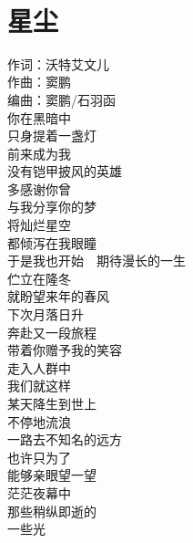 \documentclass[twocolumn]{article}
\begin{document}
\newpage
~
\newpage
\section{星尘}
\noindent
{\kaishu
	作词：沃特艾文儿\\
	作曲：窦鹏\\
	编曲：窦鹏/石羽函\\
}
你在黑暗中\\
只身提着一盏灯\\
前来成为我\\
没有铠甲披风的英雄\\
多感谢你曾\\
与我分享你的梦\\
将灿烂星空\\
都倾泻在我眼瞳\\
于是我也开始~~期待漫长的一生\\
伫立在隆冬\\
就盼望来年的春风\\
下次月落日升\\
奔赴又一段旅程\\
带着你赠予我的笑容\\
走入人群中\\
我们就这样\\
某天降生到世上\\
不停地流浪\\
一路去不知名的远方\\
也许只为了\\
能够亲眼望一望\\
茫茫夜幕中\\
那些稍纵即逝的\\
一些光\\
\end{document}
